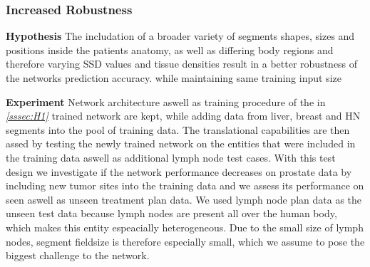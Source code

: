 \subsubsection{Increased Robustness}\label{sssec:H3}
\begin{hanginglist}\itemsep2pt

    \item\textbf{Hypothesis}\newline
    The includation of a broader variety of segments shapes, sizes and positions inside the patients anatomy, as well as differing body regions and therefore varying \acs{SSD} values and tissue densities result in a better robustness of the networks prediction accuracy. while maintaining same training input size

    \item\textbf{Experiment}\newline
    Network architecture aswell as training procedure of the in \emph{\ref{sssec:H1} } trained network are kept, while adding data from liver, breast and \acs{HN} segments into the pool of training data. 
    The translational capabilities are then assed by testing the newly trained network on the entities that were included in the training data aswell as additional lymph node test cases. 
    With this test design we investigate if the network performance decreases on prostate data by including new tumor sites into the training data and we assess its performance on seen aswell as unseen treatment plan data.
    We used lymph node plan data as the unseen test data because lymph nodes are present all over the human body, which makes this entity espeacially heterogeneous. 
    Due to the small size of lymph nodes, segment fieldsize is therefore especially small, which we assume to pose the biggest challenge to the network.

\end{hanginglist}

